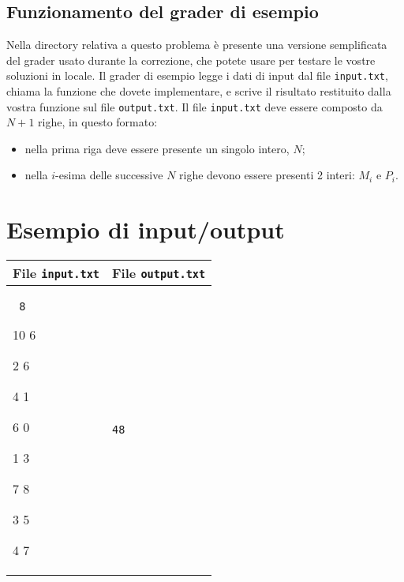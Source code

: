 \documentclass[a4paper,11pt]{article}
\newcommand{\file}[1]{\texttt{#1}}
\newcommand{\esempio}[2]{
\noindent\begin{minipage}{\textwidth}
\begin{tabular}{|p{11cm}|p{5cm}|}
    \hline
    \textbf{File \file{input.txt}} & \textbf{File \file{output.txt}}\\
    \hline
    \tt \small #1 &
    \tt \small #2 \\
    \hline
\end{tabular}
\end{minipage}
}
\begin{document}
\subsection*{Funzionamento del grader di esempio}
Nella directory relativa a questo problema è presente una versione
semplificata del grader usato durante la correzione, che potete usare
per testare le vostre soluzioni in locale. Il grader di esempio legge
i dati di input dal file \file{input.txt}, chiama la funzione che
dovete implementare, e scrive il risultato restituito dalla vostra
funzione sul file \file{output.txt}. Il file \file{input.txt} deve
essere composto da $N+1$ righe, in questo formato:
\begin{itemize}
\item nella prima riga deve essere presente un singolo intero, $N$;
\item nella $i$-esima delle successive $N$ righe devono essere presenti 2 interi: $M_i$ e $P_i$.
\end{itemize}

\section*{Esempio di input/output}

\esempio{
8

10 6

2 6

4 1

6 0

1 3

7 8

3 5

4 7
}{48}
\end{document}
